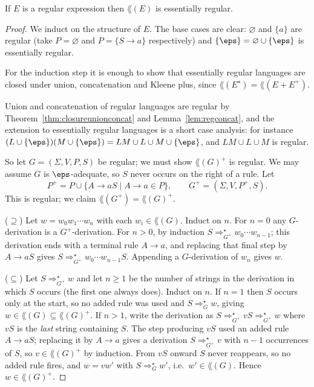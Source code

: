 \begin{theorem}\label{thm:regextoreg}
	If $E$ is a regular expression then $\lang(E)$ is essentially regular.
\end{theorem}

\begin{proof}
	We induct on the structure of $E$. The base cases are clear: $\varnothing$ and $\{a\}$ are regular (take $P = \varnothing$ and $P = \{S \to a\}$ respectively) and $\{\eps\} = \varnothing \cup \{\eps\}$ is essentially regular.

	For the induction step it is enough to show that essentially regular languages are closed under union, concatenation and Kleene plus, since $\lang(E^\star) = \lang(E + E^+)$.

	Union and concatenation of regular languages are regular by Theorem~\ref{thm:closureunionconcat} and Lemma~\ref{lem:regconcat}, and the extension to essentially regular languages is a short case analysis: for instance $(L\cup\{\eps\})(M\cup\{\eps\}) = LM \cup L \cup M \cup \{\eps\}$, and $LM \cup L \cup M$ is regular.

	So let $G = (\Sigma, V, P, S)$ be regular; we must show $\lang(G)^+$ is regular. We may assume $G$ is $\eps$-adequate, so $S$ never occurs on the right of a rule. Let
	$$P^+ = P \cup \{A \to aS \mid A \to a \in P\}, \qquad G^+ = (\Sigma, V, P^+, S).$$
	This is regular; we claim $\lang(G^+) = \lang(G)^+$.

	($\supseteq$) Let $w = w_0w_1\cdots w_n$ with each $w_i \in \lang(G)$. Induct on $n$. For $n = 0$ any $G$-derivation is a $G^+$-derivation. For $n > 0$, by induction $S \Rightarrow_{G^+}^\star w_0\cdots w_{n-1}$; this derivation ends with a terminal rule $A \to a$, and replacing that final step by $A \to aS$ gives $S \Rightarrow_{G^+}^\star w_0\cdots w_{n-1}S$. Appending a $G$-derivation of $w_n$ gives $w$.

	($\subseteq$) Let $S \Rightarrow_{G^+}^\star w$ and let $n \geq 1$ be the number of strings in the derivation in which $S$ occurs (the first one always does). Induct on $n$. If $n = 1$ then $S$ occurs only at the start, so no added rule was used and $S \Rightarrow_G^\star w$, giving $w \in \lang(G) \subseteq \lang(G)^+$. If $n > 1$, write the derivation as $S \Rightarrow_{G^+}^\star vS \Rightarrow_{G^+}^\star w$ where $vS$ is the \emph{last} string containing $S$. The step producing $vS$ used an added rule $A \to aS$; replacing it by $A \to a$ gives a derivation $S \Rightarrow_{G^+}^\star v$ with $n - 1$ occurrences of $S$, so $v \in \lang(G)^+$ by induction. From $vS$ onward $S$ never reappears, so no added rule fires, and $w = vw'$ with $S \Rightarrow_G^\star w'$, i.e.\ $w' \in \lang(G)$. Hence $w \in \lang(G)^+$.
\end{proof}

